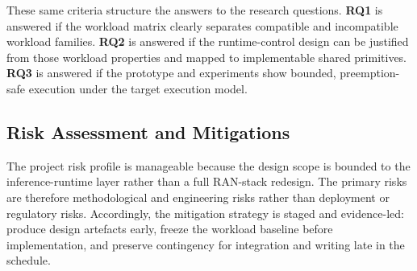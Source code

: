 \documentclass[a4paper,11pt]{article}
\begin{document}
These same criteria structure the answers to the research questions. \textbf{RQ1} is answered if the workload matrix clearly separates compatible and incompatible workload families. \textbf{RQ2} is answered if the runtime-control design can be justified from those workload properties and mapped to implementable shared primitives. \textbf{RQ3} is answered if the prototype and experiments show bounded, preemption-safe execution under the target execution model.

\subsection{Risk Assessment and Mitigations}

The project risk profile is manageable because the design scope is bounded to the inference-runtime layer rather than a full RAN-stack redesign. The primary risks are therefore methodological and engineering risks rather than deployment or regulatory risks. Accordingly, the mitigation strategy is staged and evidence-led: produce design artefacts early, freeze the workload baseline before implementation, and preserve contingency for integration and writing late in the schedule.
\end{document}
